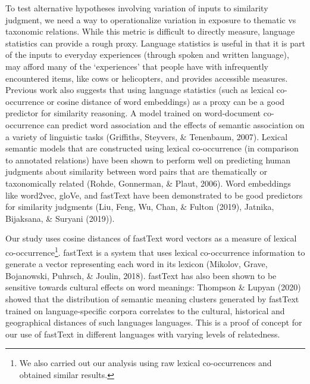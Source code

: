 \documentclass[10pt, letterpaper]{article}
\begin{document}
To test alternative hypotheses involving variation of inputs to
similarity judgment, we need a way to operationalize variation in
exposure to thematic vs taxonomic relations. While this metric is
difficult to directly measure, language statistics can provide a rough
proxy. Language statistics is useful in that it is part of the inputs to
everyday experiences (through spoken and written language), may afford
many of the `experiences' that people have with infrequently encountered
items, like cows or helicopters, and provides accessible measures.
Previous work also suggests that using language statistics (such as
lexical co-occurrence or cosine distance of word embeddings) as a proxy
can be a good predictor for similarity reasoning. A model trained on
word-document co-occurrence can predict word association and the effects
of semantic association on a variety of linguistic tasks (Griffiths,
Steyvers, \& Tenenbaum, 2007). Lexical semantic models that are
constructed using lexical co-occurrence (in comparison to annotated
relations) have been shown to perform well on predicting human judgments
about similarity between word pairs that are thematically or
taxonomically related (Rohde, Gonnerman, \& Plaut, 2006). Word
embeddings like word2vec, gloVe, and fastText have been demonstrated to
be good predictors for similarity judgments (Liu, Feng, Wu, Chan, \&
Fulton (2019), Jatnika, Bijaksana, \& Suryani (2019)).

Our study uses cosine distances of fastText word vectors as a measure of
lexical co-occurrence\footnote{We also carried out our analysis using
  raw lexical co-occurrences and obtained similar results.}. fastText is
a system that uses lexical co-occurrence information to generate a
vector representing each word in its lexicon (Mikolov, Grave,
Bojanowski, Puhrsch, \& Joulin, 2018). fastText has also been shown to
be sensitive towards cultural effects on word meanings: Thompson \&
Lupyan (2020) showed that the distribution of semantic meaning clusters
generated by fastText trained on language-specific corpora correlates to
the cultural, historical and geographical distances of such languages
languages. This is a proof of concept for our use of fastText in
different languages with varying levels of relatedness.
\end{document}
